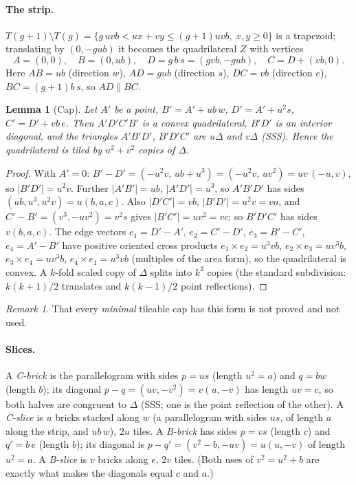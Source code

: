 \documentclass[11pt]{article}
\newtheorem{lemma}[theorem]{Lemma}
\theoremstyle{remark}
\newtheorem{remark}[theorem]{Remark}
\begin{document}
\paragraph{The strip.}
$T(g+1)\setminus T(g)=\{g\,uvb<ux+vy\le(g+1)uvb,\ x,y\ge0\}$ is a trapezoid; translating by $(0,-gub)$ it becomes the quadrilateral $Z$ with vertices
\[
A=(0,0),\quad B=(0,ub),\quad D=g\,b\,s=(gvb,-gub),\quad C=D+(vb,0).
\]
Here $AB=ub$ (direction $w$), $AD=gub$ (direction $s$), $DC=vb$ (direction $e$), $BC=(g+1)b\,s$, so $AD\parallel BC$.

\begin{lemma}[Cap]\label{lem:cap}
Let $A'$ be a point, $B'=A'+ub\,w$, $D'=A'+u^2s$, $C'=D'+vb\,e$. Then $A'D'C'B'$ is a convex quadrilateral, $B'D'$ is an interior diagonal, and the triangles $A'B'D'$, $B'D'C'$ are $u\Delta$ and $v\Delta$ (SSS). Hence the quadrilateral is tiled by $u^2+v^2$ copies of $\Delta$.
\end{lemma}
\begin{proof}
With $A'=0$: $B'-D'=(-u^2v,\,ub+u^3)=(-u^2v,\,uv^2)=uv\,(-u,v)$, so $|B'D'|=u^2v$. Further $|A'B'|=ub$, $|A'D'|=u^3$, so $A'B'D'$ has sides $(ub,u^3,u^2v)=u(b,a,c)$. Also $|D'C'|=vb$, $|B'D'|=u^2v=va$, and $C'-B'=(v^3,-uv^2)=v^2s$ gives $|B'C'|=uv^2=vc$; so $B'D'C'$ has sides $v(b,a,c)$. The edge vectors $e_1=D'-A'$, $e_2=C'-D'$, $e_3=B'-C'$, $e_4=A'-B'$ have positive oriented cross products $e_1\times e_2=u^3vb$, $e_2\times e_3=uv^3b$, $e_3\times e_4=uv^3b$, $e_4\times e_1=u^3vb$ (multiples of the area form), so the quadrilateral is convex. A $k$-fold scaled copy of $\Delta$ splits into $k^2$ copies (the standard subdivision: $k(k+1)/2$ translates and $k(k-1)/2$ point reflections). \qedhere
\end{proof}
\begin{remark}
That every \emph{minimal} tileable cap has this form is not proved and not used.
\end{remark}

\paragraph{Slices.} A \emph{C-brick} is the parallelogram with sides $p=us$ (length $u^2=a$) and $q=bw$ (length $b$); its diagonal $p-q=(uv,-v^2)=v(u,-v)$ has length $uv=c$, so both halves are congruent to $\Delta$ (SSS; one is the point reflection of the other). A \emph{C-slice} is $u$ bricks stacked along $w$ (a parallelogram with sides $us$, of length $a$ along the strip, and $ub\,w$), $2u$ tiles. A \emph{B-brick} has sides $p=vs$ (length $c$) and $q'=b\,e$ (length $b$); its diagonal is $p-q'=(v^2-b,-uv)=u(u,-v)$ of length $u^2=a$. A \emph{B-slice} is $v$ bricks along $e$, $2v$ tiles. (Both uses of $v^2=u^2+b$ are exactly what makes the diagonals equal $c$ and $a$.)
\end{document}

